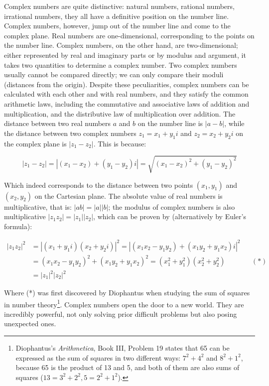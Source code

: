 \documentclass[b5paper]{article}
\begin{document}
Complex numbers are quite distinctive: natural numbers, rational numbers, irrational numbers, they all have a definitive position on the number line. Complex numbers, however, jump out of the number line and come to the complex plane. Real numbers are one-dimensional, corresponding to the points on the number line. Complex numbers, on the other hand, are two-dimensional; either represented by real and imaginary parts or by modulus and argument, it takes two quantities to determine a complex number. Two complex numbers usually cannot be compared directly; we can only compare their moduli (distances from the origin). Despite these peculiarities, complex numbers can be calculated with each other and with real numbers, and they satisfy the common arithmetic laws, including the commutative and associative laws of addition and multiplication, and the distributive law of multiplication over addition. The distance between two real numbers $a$ and $b$ on the number line is $|a - b|$, while the distance between two complex numbers $z_1 = x_1 + y_1i$ and $z_2 = x_2 + y_2i$ on the complex plane is $|z_1 - z_2|$. This is because:

\[
|z_1 - z_2| = |(x_1 - x_2) + (y_1 - y_2)i| = \sqrt{(x_1 - x_2)^2 + (y_1 - y_2)^2}
\]

Which indeed corresponds to the distance between two points $(x_1, y_1)$ and $(x_2, y_2)$ on the Cartesian plane. The absolute value of real numbers is multiplicative, that is: $|ab| = |a||b|$; the modulus of complex numbers is also multiplicative $|z_1z_2| = |z_1||z_2|$, which can be proven by (alternatively by Euler's formula):

\begin{align*}
|z_1z_2|^2 &= |(x_1 + y_1i)(x_2 + y_2i)|^2 = |(x_1x_2 - y_1y_2) + (x_1y_2 + y_1x_2)i|^2 \\
  &= (x_1x_2 - y_1y_2)^2 + (x_1y_2 + y_1x_2)^2 = (x_1^2 + y_1^2)(x_2^2 + y_2^2) && (*) \\
  &= |z_1|^2|z_2|^2
\end{align*}

Where (*) was first discovered by Diophantus when studying the sum of squares in number theory\footnote{Diophantus's \emph{Arithmetica}, Book III, Problem 19 states that 65 can be expressed as the sum of squares in two different ways: $7^2 + 4^2$ and $8^2 + 1^2$, because 65 is the product of 13 and 5, and both of them are also sums of squares ($13 = 3^2 + 2^2, 5 = 2^2 + 1^2$).}. Complex numbers open the door to a new world. They are incredibly powerful, not only solving prior difficult problems but also posing unexpected ones.
\end{document}
